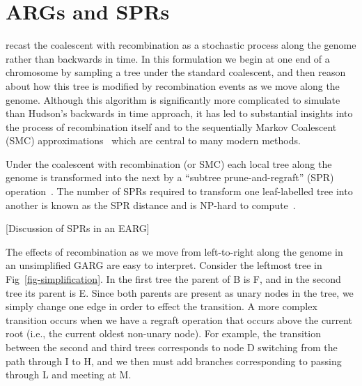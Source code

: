 \documentclass{article}
\begin{document}
\section*{ARGs and SPRs}
\citet{wiuf1999ancestry,wiuf1999recombination} recast
the coalescent with recombination
as a stochastic process along the genome rather than backwards in time.
In this formulation we begin at one end of a chromosome by
sampling a tree under the standard coalescent, and then reason
about how this tree is modified by recombination events
as we move along the genome. Although this algorithm is
significantly more complicated to simulate than Hudson's
backwards in time approach, it has led to substantial
insights into the process of recombination itself
and to the sequentially Markov Coalescent (SMC)
approximations~\citep{mcvean2005approximating,marjoram2006fast}
which are central to many modern methods.

Under the coalescent with recombination (or SMC) each local
tree along the genome is transformed into the next by
a ``subtree prune-and-regraft'' (SPR)
operation~\citep{hein1990reconstructing,song2003on,song2006properties}.
The number of SPRs required to transform one leaf-labelled tree
into another is known as the SPR distance
and is NP-hard to
compute~\citep{hein1996complexity,allen2001subtree,bordewich2005computational}.

[Discussion of SPRs in an EARG]

The effects of recombination as we move from left-to-right along
the genome in an unsimplified GARG are easy to interpret.
Consider the leftmost tree in Fig~\ref{fig-simplification}.
In the first tree the parent of B is F, and in the second
tree its parent is E. Since both parents are present as
unary nodes in the tree, we simply change one edge in
order to effect the transition.
A more complex transition occurs when we have a regraft operation
that occurs above the current root (i.e., the current oldest
non-unary node). For example, the transition between the
second and third trees corresponds to node D switching
from the path through I to H, and we then must add branches
corresponding to passing through L and meeting at M.
\end{document}

